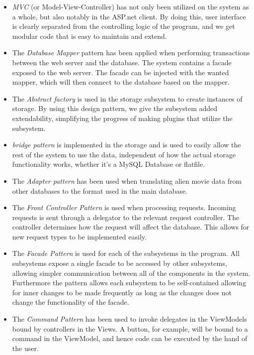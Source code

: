 \begin{itemize}
	\item \emph{MVC} (or Model-View-Controller) has not only been utilized on the system as a whole, but also notably in the ASP.net client. By doing this, user interface is clearly separated from the controlling logic of the program, and we get modular code that is easy to maintain and extend.
	\item The \emph{Database Mapper} pattern has been applied when performing transactions between the web server and the database. The system contains a facade exposed to the web server. The facade can be injected with the wanted mapper, which will then connect to the database based on the mapper.
	\item The \emph{Abstract factory} is used in the storage subsystem to create instances of storage. By using this design pattern, we give the subsystem added extendability, simplifying the progress of making plugins that utilize the subsystem.
	\item \emph{bridge pattern} is implemented in the storage and is used to easily allow the rest of the system to use the data, independent of how the actual storage functionality works, whether it's a MySQL Database or flatfile.
	\item The \emph{Adapter pattern} has been used when translating alien movie data from other databases to the format used in the main database.
	\item The \emph{Front Controller Pattern} is used when processing requests. Incoming requests is sent through a delegator to the relevant request controller. The controller determines how the request will affect the database. This allows for new request types to be implemented easily.
	\item The \emph{Facade Pattern} is used for each of the subsystems in the program. All subsystems expose a single facade to be accessed by other subsystems, allowing simpler communication between all of the components in the system. Furthermore the pattern allows each subsystem to be self-contained allowing for inner changes to be made frequently as long as the changes does not change the functionality of the facade.
	\item The \emph{Command Pattern} has been used to invoke delegates in the ViewModels bound by controllers in the Views. A button, for example, will be bound to a command in the ViewModel, and hence code can be executed by the hand of the user.
\end{itemize}

